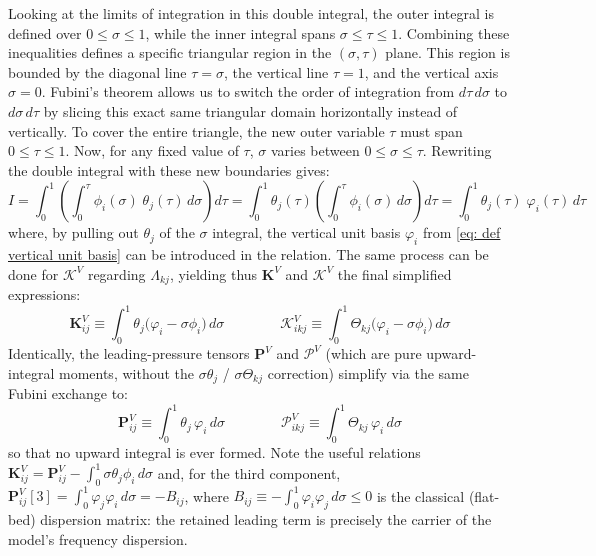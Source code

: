 \documentclass{article}
\newcommand{\VKij}{\mathbf{K}_{ij}^V}
\newcommand{\VKikj}{\boldsymbol{\mathcal{K}}_{ikj}^V}
\newcommand{\VmK}{\mathbf{K}^V}
\newcommand{\VtK}{\boldsymbol{\mathcal{K}}^V}
\newcommand{\VPij}{\mathbf{P}_{ij}^V}
\newcommand{\VPikj}{\boldsymbol{\mathcal{P}}_{ikj}^V}
\newcommand{\VmP}{\mathbf{P}^V}
\newcommand{\VtP}{\boldsymbol{\mathcal{P}}^V}
\begin{document}
Looking at the limits of integration in this double integral, the outer integral is defined over $0 \le \sigma \le 1$, while the inner integral spans $\sigma \le \tau \le 1$. 
Combining these inequalities defines a specific triangular region in the $(\sigma, \tau)$ plane. 
This region is bounded by the diagonal line $\tau = \sigma$, the vertical line $\tau = 1$, and the vertical axis $\sigma = 0$.
Fubini's theorem allows us to switch the order of integration from $d\tau \, d\sigma$ to $d\sigma \, d\tau$ by slicing this exact same triangular domain horizontally instead of vertically. 
To cover the entire triangle, the new outer variable $\tau$ must span $0 \le \tau \le 1$. 
Now, for any fixed value of $\tau$, $\sigma$ varies between $0 \le \sigma \le \tau$.
Rewriting the double integral with these new boundaries gives:
$$I = \int_0^1 \left( \int_0^\tau \phi_i(\sigma) \; \theta_j(\tau) \, d\sigma \right) d\tau =  \int_0^1 \theta_j(\tau) \left( \int_0^\tau \phi_i(\sigma) \, d\sigma \right) d\tau = \int_0^1 \theta_j(\tau) \; \varphi_i(\tau)\,d\tau$$
where, by pulling out $\theta_j$ of the $\sigma$ integral, the vertical unit basis $\varphi_i$ from \eqref{eq: def vertical unit basis} can be introduced in the relation. 
The same process can be done for $\VtK$ regarding $\Lambda_{kj}$, yielding thus $\VmK$ and $\VtK$ the final simplified expressions:
\begin{equation}
    \boxed{\VKij \equiv \int_0^1 \theta_j \big(\varphi_i-\sigma \phi_i \big) \, d\sigma} \qquad \qquad \boxed{\VKikj \equiv \int_0^1  \Theta_{kj} \big( \varphi_i-\sigma \phi_i \big)\, d\sigma}
    \label{eq: RHS residual simplified tensors}
\end{equation}
Identically, the leading-pressure tensors $\VmP$ and $\VtP$ (which are pure upward-integral moments, without the $\sigma\theta_j$ / $\sigma\Theta_{kj}$ correction) simplify via the same Fubini exchange to:
\begin{equation}
    \boxed{\VPij \equiv \int_0^1 \theta_j \,\varphi_i \, d\sigma} \qquad \qquad \boxed{\VPikj \equiv \int_0^1 \Theta_{kj}\, \varphi_i \, d\sigma}
    \label{eq: leading pressure simplified tensors}
\end{equation}
so that no upward integral is ever formed. Note the useful relations $\VKij = \VPij - \int_0^1 \sigma\theta_j\phi_i\,d\sigma$ and, for the third component, $\VPij[3] = \int_0^1 \varphi_j\varphi_i\,d\sigma = -B_{ij}$, where $B_{ij} \equiv -\int_0^1\varphi_i\varphi_j\,d\sigma \le 0$ is the classical (flat-bed) dispersion matrix: the retained leading term is precisely the carrier of the model's frequency dispersion.
\end{document}
